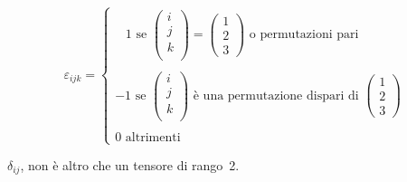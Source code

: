 \begin{esempio}
$$
\varepsilon_{ijk}=\left\{\begin{array}{l} \;\;\;1 \mbox{ se }
\left(\begin{array}{c}
i\\j\\k\\\end{array}\right)=\left(\begin{array}{c}
1\\2\\3\end{array}\right) \mbox{ o permutazioni pari}\\
\mbox{ }\\
-1 \mbox{ se } \left(\begin{array}{c} i\\j\\k\\\end{array}\right)
\mbox{ \`e una permutazione dispari di } \left(\begin{array}{c}
1\\2\\3\end{array}\right)\\
\mbox{}\\
0 \mbox{ altrimenti}
\end{array} \right.
$$
\end{esempio}
\begin{esempio}
$\delta_{ij}$, non \`e altro che un tensore di rango~2.
\end{esempio}
